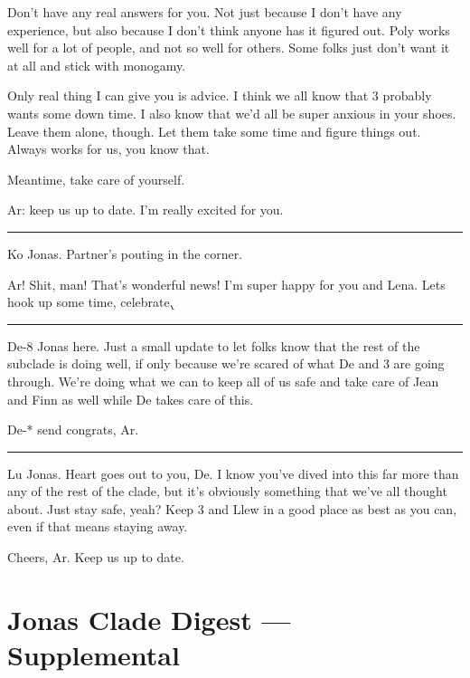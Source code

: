 Don't have any real answers for you. Not just because I don't have any experience, but also because I don't think anyone has it figured out. Poly works well for a lot of people, and not so well for others. Some folks just don't want it at all and stick with monogamy.

Only real thing I can give you is advice. I think we all know that 3 probably wants some down time. I also know that we'd all be super anxious in your shoes. Leave them alone, though. Let them take some time and figure things out. Always works for us, you know that.

Meantime, take care of yourself.

Ar: keep us up to date. I'm really excited for you.

\begin{center}\rule{0.5\linewidth}{\linethickness}\end{center}

Ko Jonas. Partner's pouting in the corner.

Ar! Shit, man! That's wonderful news! I'm super happy for you and Lena. Lets hook up some time, celebrate.̨

\begin{center}\rule{0.5\linewidth}{\linethickness}\end{center}

De-8 Jonas here. Just a small update to let folks know that the rest of the subclade is doing well, if only because we're scared of what De and 3 are going through. We're doing what we can to keep all of us safe and take care of Jean and Finn as well while De takes care of this.

De-* send congrats, Ar.

\begin{center}\rule{0.5\linewidth}{\linethickness}\end{center}

Lu Jonas. Heart goes out to you, De. I know you've dived into this far more than any of the rest of the clade, but it's obviously something that we've all thought about. Just stay safe, yeah? Keep 3 and Llew in a good place as best as you can, even if that means staying away.

Cheers, Ar. Keep us up to date.

\newpage
\hypertarget{jonas-clade-digest-supplemental-1}{%
\section*{Jonas Clade Digest --- Supplemental}\label{jonas-clade-digest-supplemental-1}}

